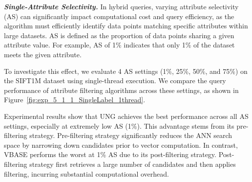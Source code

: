 \documentclass[sigconf, nonacm]{acmart}
\begin{document}
	
	\textit{\textbf{Single-Attribute Selectivity.}}
	In hybrid queries, varying attribute selectivity (AS) can significantly impact computational cost and query efficiency, as the algorithm must efficiently identify data points matching specific attributes within large datasets. AS is defined as the proportion of data points sharing a given attribute value. For example, AS of 1\% indicates that only 1\% of the dataset meets the given attribute. 
	
	To investigate this effect, we evaluate 4 AS settings (1\%, 25\%, 50\%, and 75\%) on the SIFT1M dataset using single-thread execution. We compare the query performance of attribute filtering algorithms across these settings, as shown in Figure~\ref{fig:exp_5_1_1_SingleLabel_1thread}.
	
	Experimental results show that UNG achieves the best performance across all AS settings, especially at extremely low AS (1\%). 
	This advantage stems from its pre-filtering strategy. Pre-filtering strategy significantly reduces the ANN search space by narrowing down candidates prior to vector computation. In contrast, VBASE performs the worst at 1\% AS due to its post-filtering strategy. Post-filtering strategy first retrieves a large number of candidates and then applies filtering, incurring substantial computational overhead.
	
	
	
\end{document}
